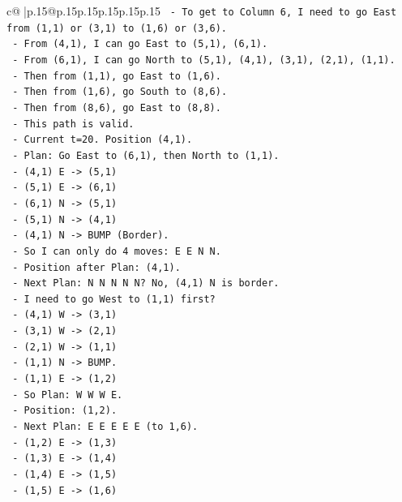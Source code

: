 \documentclass{article}
\begin{document}
{\begin{supertabular}{c@{$\;$}|p{.15\linewidth}@{}p{.15\linewidth}p{.15\linewidth}p{.15\linewidth}p{.15\linewidth}p{.15\linewidth}}
{{{\texttt{   {-} To get to Column 6, I need to go East from (1,1) or (3,1) to (1,6) or (3,6).} \\
\texttt{   {-} From (4,1), I can go East to (5,1), (6,1).} \\
\texttt{   {-} From (6,1), I can go North to (5,1), (4,1), (3,1), (2,1), (1,1).} \\
\texttt{   {-} Then from (1,1), go East to (1,6).} \\
\texttt{   {-} Then from (1,6), go South to (8,6).} \\
\texttt{   {-} Then from (8,6), go East to (8,8).} \\
\texttt{   {-} This path is valid.} \\
\texttt{   {-} Current t=20. Position (4,1).} \\
\texttt{   {-} Plan: Go East to (6,1), then North to (1,1).} \\
\texttt{   {-} (4,1) E {-}> (5,1)} \\
\texttt{   {-} (5,1) E {-}> (6,1)} \\
\texttt{   {-} (6,1) N {-}> (5,1)} \\
\texttt{   {-} (5,1) N {-}> (4,1)} \\
\texttt{   {-} (4,1) N {-}> BUMP (Border).} \\
\texttt{   {-} So I can only do 4 moves: E E N N.} \\
\texttt{   {-} Position after Plan: (4,1).} \\
\texttt{   {-} Next Plan: N N N N N? No, (4,1) N is border.} \\
\texttt{   {-} I need to go West to (1,1) first?} \\
\texttt{   {-} (4,1) W {-}> (3,1)} \\
\texttt{   {-} (3,1) W {-}> (2,1)} \\
\texttt{   {-} (2,1) W {-}> (1,1)} \\
\texttt{   {-} (1,1) N {-}> BUMP.} \\
\texttt{   {-} (1,1) E {-}> (1,2)} \\
\texttt{   {-} So Plan: W W W E.} \\
\texttt{   {-} Position: (1,2).} \\
\texttt{   {-} Next Plan: E E E E E (to 1,6).} \\
\texttt{   {-} (1,2) E {-}> (1,3)} \\
\texttt{   {-} (1,3) E {-}> (1,4)} \\
\texttt{   {-} (1,4) E {-}> (1,5)} \\
\texttt{   {-} (1,5) E {-}> (1,6)} \\
}}}
\end{supertabular}}
\end{document}
